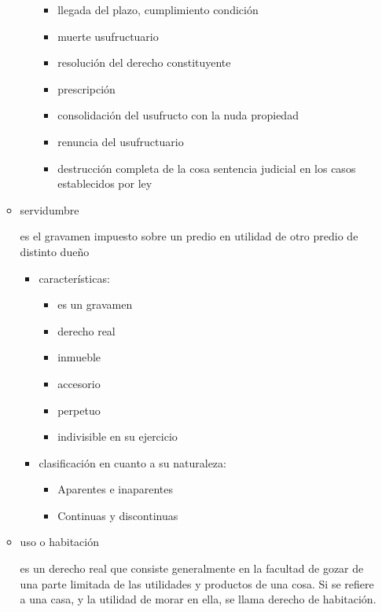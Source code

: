 \documentclass[]{article}
\providecommand{\tightlist}{%
  \setlength{\itemsep}{0pt}\setlength{\parskip}{0pt}}
\begin{document}
\begin{itemize}
\begin{itemize}
\begin{itemize}
      \begin{itemize}
      \tightlist
      \item
        llegada del plazo, cumplimiento condición
      \item
        muerte usufructuario
      \item
        resolución del derecho constituyente
      \item
        prescripción
      \item
        consolidación del usufructo con la nuda propiedad
      \item
        renuncia del usufructuario
      \item
        destrucción completa de la cosa sentencia judicial en los casos
        establecidos por ley
      \end{itemize}
    \end{itemize}
  \item
    servidumbre

    es el gravamen impuesto sobre un predio en utilidad de otro predio
    de distinto dueño

    \begin{itemize}
    \tightlist
    \item
      características:

      \begin{itemize}
      \tightlist
      \item
        es un gravamen
      \item
        derecho real
      \item
        inmueble
      \item
        accesorio
      \item
        perpetuo
      \item
        indivisible en su ejercicio
      \end{itemize}
    \item
      clasificación en cuanto a su naturaleza:

      \begin{itemize}
      \tightlist
      \item
        Aparentes e inaparentes
      \item
        Continuas y discontinuas
      \end{itemize}
    \end{itemize}
  \item
    uso o habitación

    es un derecho real que consiste generalmente en la facultad de gozar
    de una parte limitada de las utilidades y productos de una cosa. Si
    se refiere a una casa, y la utilidad de morar en ella, se llama
    derecho de habitación.


\end{itemize}
\end{itemize}
\end{document}
